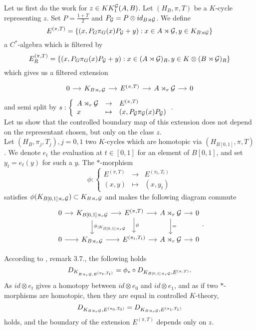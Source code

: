 Let us first do the work for $z\in KK_1^\mathcal G(A,B)$. Let $(H_B,\pi,T)$ be a $K$-cycle representing $z$. Set $P=\frac{1+T}{2}$ and $P_\mathcal G=P\otimes id_{B\rtimes \mathcal G}$. We define
\[E^{(\pi,T)}=\{(x,P_G\pi_G(x)P_\mathcal G + y) : x\in A\rtimes \mathcal G, y\in K_{B\rtimes\mathcal G}\}\]
a $C^*$-algebra which is filtered by
\[E_R^{(\pi,T)}=\{(x,P_G\pi_G(x)P_\mathcal G + y) : x\in (A\rtimes \mathcal G)_R, y\in K\otimes (B\rtimes\mathcal G)_R\}\]
which gives us a filtered extension
\[\begin{tikzcd}[column sep = small]
0\arrow{r} & K_{B\rtimes_r\G}\arrow{r} & E^{(\pi,T)} \arrow{r} & A\rtimes_r \G \arrow{r}& 0
\end{tikzcd}\]
and semi split by  $s :\left\{\begin{array}{lll}A\rtimes_r \mathcal G & \rightarrow & E^{(\pi,T)} \\ x & \mapsto & (x, P_\mathcal G \pi_\mathcal G(x)P_\mathcal G)\end{array}\right.$.\\

Let us show that the controlled boundary map of this extension does not depend on the representant chosen, but only on the class $z$.\\
Let $(H_B, \pi_j,T_j), j=0,1$ two $K$-cycles which are homotopic via $(H_{B[0,1]},\pi,T)$. We denote $e_t$ the evaluation at $t\in[0,1]$ for an element of $B[0,1]$, and set $y_t=e_t(y)$ for such a $y$. The $*$-morphism
\[\phi : \left\{\begin{array}{lll}E^{(\pi,T)} & \rightarrow & E^{(\pi_t,T_t)} \\ (x,y) & \mapsto & (x, y_t)\end{array}\right.\]
satisfies $\phi(K_{B[0,1] \rtimes_r \mathcal G})\subset K_{B \rtimes_r \mathcal G}$ and makes the following diagram commute
\[\begin{tikzcd}[column sep = small]
0\arrow{r} & K_{B[0,1] \rtimes_r \G}\arrow{r}\arrow{d}{\phi_{|K_{B[0,1] \rtimes_r \G}}} & E^{(\pi,T)} \arrow{r}\arrow{d}{\phi} & A\rtimes_r \G \arrow{r}\arrow{d}{=}& 0 \\
0\arrow{r} & K_{B \rtimes_r \G}\arrow{r} &  E^{(\pi_t,T_t)} \arrow{r} & A\rtimes_r \G \arrow{r} & 0
\end{tikzcd}.\]

According to \cite{OY2}, remark $3.7.$, the following holds
\[D_{K_{B\rtimes_r\mathcal G,E^{(\pi_t,T_t)}}} = \phi_* \circ D_{K_{B[0,1]\rtimes_r\mathcal G},E^{(\pi,T)}}.\]
As $id \otimes e_t$ gives a homotopy between $id\otimes e_0$ and $id\otimes e_1$, and as if two $*$-morphisms are homotopic, then they are equal in controlled $K$-theory, 
\[D_{K_{B\rtimes_r \mathcal G}, E^{(\pi_0,T_0)}}=D_{K_{B\rtimes_r \mathcal G}, E^{(\pi_1,T_1)}}\]
holds, and the boundary of the extension $E^{(\pi,T)}$ depends only on $z$.\\

